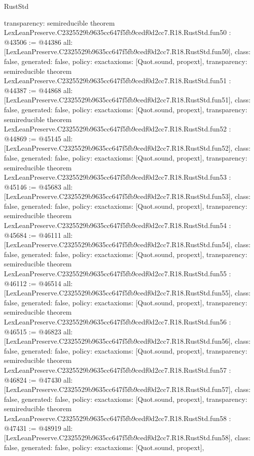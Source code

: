 \begin{lexlean}{RustStd}
\begin{coremodule}
{  transparency: semireducible
}
theorem LexLeanPreserve.C2325529b9635cc647f5fb9cedf0d2cc7.R18.RustStd.fun50 : @43506 := @44386 {
  all: [LexLeanPreserve.C2325529b9635cc647f5fb9cedf0d2cc7.R18.RustStd.fun50],
  class: false,
  generated: false,
  policy: exact{axioms: [Quot.sound, propext]},
  transparency: semireducible
}
theorem LexLeanPreserve.C2325529b9635cc647f5fb9cedf0d2cc7.R18.RustStd.fun51 : @44387 := @44868 {
  all: [LexLeanPreserve.C2325529b9635cc647f5fb9cedf0d2cc7.R18.RustStd.fun51],
  class: false,
  generated: false,
  policy: exact{axioms: [Quot.sound, propext]},
  transparency: semireducible
}
theorem LexLeanPreserve.C2325529b9635cc647f5fb9cedf0d2cc7.R18.RustStd.fun52 : @44869 := @45145 {
  all: [LexLeanPreserve.C2325529b9635cc647f5fb9cedf0d2cc7.R18.RustStd.fun52],
  class: false,
  generated: false,
  policy: exact{axioms: [Quot.sound, propext]},
  transparency: semireducible
}
theorem LexLeanPreserve.C2325529b9635cc647f5fb9cedf0d2cc7.R18.RustStd.fun53 : @45146 := @45683 {
  all: [LexLeanPreserve.C2325529b9635cc647f5fb9cedf0d2cc7.R18.RustStd.fun53],
  class: false,
  generated: false,
  policy: exact{axioms: [Quot.sound, propext]},
  transparency: semireducible
}
theorem LexLeanPreserve.C2325529b9635cc647f5fb9cedf0d2cc7.R18.RustStd.fun54 : @45684 := @46111 {
  all: [LexLeanPreserve.C2325529b9635cc647f5fb9cedf0d2cc7.R18.RustStd.fun54],
  class: false,
  generated: false,
  policy: exact{axioms: [Quot.sound, propext]},
  transparency: semireducible
}
theorem LexLeanPreserve.C2325529b9635cc647f5fb9cedf0d2cc7.R18.RustStd.fun55 : @46112 := @46514 {
  all: [LexLeanPreserve.C2325529b9635cc647f5fb9cedf0d2cc7.R18.RustStd.fun55],
  class: false,
  generated: false,
  policy: exact{axioms: [Quot.sound, propext]},
  transparency: semireducible
}
theorem LexLeanPreserve.C2325529b9635cc647f5fb9cedf0d2cc7.R18.RustStd.fun56 : @46515 := @46823 {
  all: [LexLeanPreserve.C2325529b9635cc647f5fb9cedf0d2cc7.R18.RustStd.fun56],
  class: false,
  generated: false,
  policy: exact{axioms: [Quot.sound, propext]},
  transparency: semireducible
}
theorem LexLeanPreserve.C2325529b9635cc647f5fb9cedf0d2cc7.R18.RustStd.fun57 : @46824 := @47430 {
  all: [LexLeanPreserve.C2325529b9635cc647f5fb9cedf0d2cc7.R18.RustStd.fun57],
  class: false,
  generated: false,
  policy: exact{axioms: [Quot.sound, propext]},
  transparency: semireducible
}
theorem LexLeanPreserve.C2325529b9635cc647f5fb9cedf0d2cc7.R18.RustStd.fun58 : @47431 := @48919 {
  all: [LexLeanPreserve.C2325529b9635cc647f5fb9cedf0d2cc7.R18.RustStd.fun58],
  class: false,
  generated: false,
  policy: exact{axioms: [Quot.sound, propext]},
}
\end{coremodule}
\end{lexlean}

